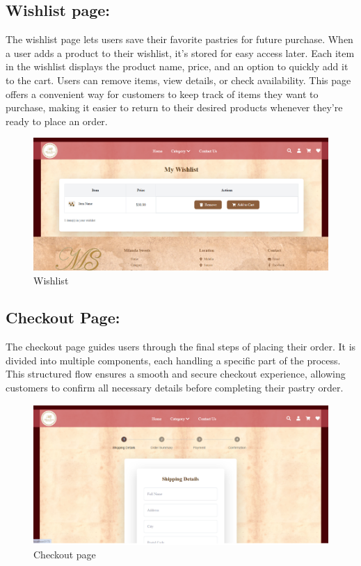 \subsection{Wishlist page:}

The wishlist page lets users save their favorite pastries for future purchase. When a user adds a product to their wishlist, it’s stored for easy access later. Each item in the wishlist displays the product name, price, and an option to quickly add it to the cart. Users can remove items, view details, or check availability. This page offers a convenient way for customers to keep track of items they want to purchase, making it easier to return to their desired products whenever they're ready to place an order.

\begin{figure}[!h]
\begin{center}
\includegraphics{images/Wishlist.png}
\end{center}
\caption{Wishlist}
\end{figure}

\subsection{Checkout Page:}

The checkout page guides users through the final steps of placing their order. It is divided into multiple components, each handling a specific part of the process. This structured flow ensures a smooth and secure checkout experience, allowing customers to confirm all necessary details before completing their pastry order.

\begin{figure}[!h]
\begin{center}
\includegraphics{images/checkout page.png}
\end{center}
\caption{Checkout page}
\end{figure}

